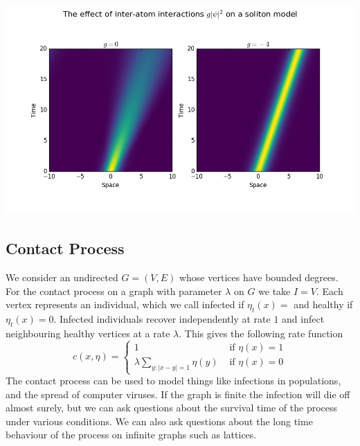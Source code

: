 \documentclass[12pt,a2paper,landscape]{article}
\begin{document}
\begin{multicols*}{3}
{{\begin{center}
\includegraphics[scale=0.5]{milestonepic.png}
\end{center}

\subsection*{Contact Process}
We consider an undirected $G=(V,E)$ whose vertices have bounded degrees. For the contact process on 
a graph with parameter $\lambda$ on $G$ we take $I=V$. Each vertex represents an individual, which we call 
infected if $\eta_{t}(x)=$ and healthy if $\eta_{t}(x)=0$. Infected individuals recover independently at rate $1$
and infect neighbouring healthy vertices at a rate $\lambda$. This gives the following rate function
\begin{equation*}
c(x, \eta)=
\begin{cases}
1 & \mbox{ if } \eta(x)=1\\
\lambda \sum_{y: |x-y|=1}\eta(y) & \mbox{ if } \eta(x)=0
\end{cases}
\end{equation*}
The contact process can be used to model things like infections in populations, and the spread of computer
viruses. If the graph is finite the infection will die off almost surely, but we can ask questions about the 
survival time of the process under various conditions. We can also ask questions about the long time 
behaviour of the process on infinite graphs such as lattices.

}}
\end{multicols*}
\end{document}
